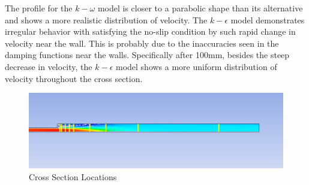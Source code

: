 \noindent The profile for the $k-\omega$ model is closer to a parabolic shape than its alternative and shows a more realistic distribution of velocity. The $k-\epsilon$ model demonstrates irregular behavior with satisfying the no-slip condition by such rapid change in velocity near the wall. This is probably due to the inaccuracies seen in the damping functions near the walls. Specifically after 100mm, besides the steep decrease in velocity, the $k-\epsilon$ model shows a more uniform distribution of velocity throughout the cross section.



\begin{figure}[H]
    \centering
    \includegraphics[width=.9\textwidth]{images/task2/task2-1/cross_section_locations.png}
    \caption{Cross Section Locations}
    \label{fig:task2cross}
\end{figure}


